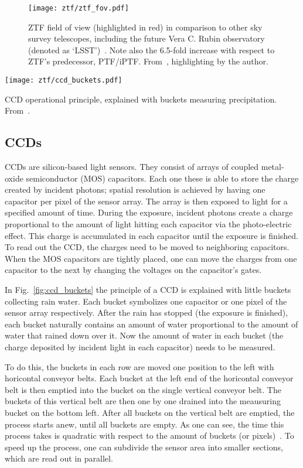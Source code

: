 \begin{figure}[htb]
    \texttt{[image: ztf/ztf\_fov.pdf]}
    \caption[ZTF field of view]{ZTF field of view (highlighted in red) in comparison to other sky survey telescopes, including the future Vera C. Rubin observatory (denoted as `LSST')~\cite{Ivezic2019}. Note also the 6.5-fold increase with respect to ZTF's predecessor, PTF/iPTF. From~\cite{Laher2018}, highlighting by the author.}
\end{figure}

\begin{marginfigure}
    \texttt{[image: ztf/ccd\_buckets.pdf]}
    \caption[CCD operational principle]{CCD operational principle, explained with buckets measuring precipitation. From~\cite{Janesick1987}.}
\end{marginfigure}

\subsection{CCDs}\label{ccd}
CCDs are silicon-based light sensors. They consist of arrays of coupled metal-oxide semiconductor (MOS) capacitors. Each one these is able to store the charge created by incident photons; spatial resolution is achieved by having one capacitor per pixel of the sensor array. The array is then exposed to light for a specified amount of time. During the exposure, incident photons create a charge proportional to the amount of light hitting each capacitor via the photo-electric effect. This charge is accumulated in each capacitor until the exposure is finished. To read out the CCD, the charges need to be moved to neighboring capacitors. When the MOS capacitors are tightly placed, one can move the charges from one capacitor to the next by changing the voltages on the capacitor's gates.

In Fig.~\ref{fig:ccd_buckets} the principle of a CCD is explained with little buckets collecting rain water. Each bucket symbolizes one capacitor or one pixel of the sensor array respectively. After the rain has stopped (the exposure is finished), each bucket naturally contains an amount of water proportional to the amount of water that rained down over it. Now the amount of water in each bucket (the charge deposited by incident light in each capacitor) needs to be measured.

To do this, the buckets in each row are moved one position to the left with horicontal conveyor belts. Each bucket at the left end of the horicontal conveyor belt is then emptied into the bucket on the single vertical conveyor belt. The buckets of this vertical belt are then one by one drained into the meausuring bucket on the bottom left. After all buckets on the vertical belt are emptied, the process starts anew, until all buckets are empty. As one can see, the time this process takes is quadratic with respect to the amount of buckets (or pixels)~. To speed up the process, one can subdivide the sensor area into smaller sections, which are read out in parallel.

